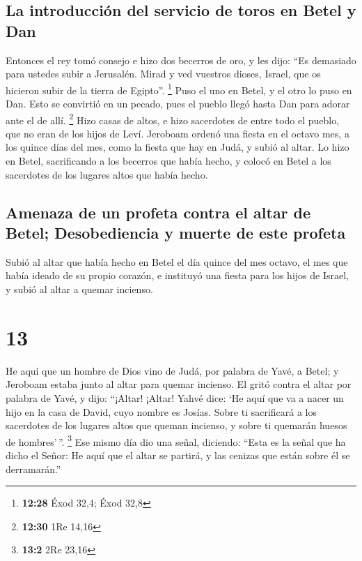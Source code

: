 \hypertarget{la-introducciuxf3n-del-servicio-de-toros-en-betel-y-dan}{%
\subsection{La introducción del servicio de toros en Betel y
Dan}\label{la-introducciuxf3n-del-servicio-de-toros-en-betel-y-dan}}

 Entonces el rey tomó consejo e hizo dos becerros de oro,
y les dijo: ``Es demasiado para ustedes subir a Jerusalén. Mirad y ved
vuestros dioses, Israel, que os hicieron subir de la tierra de Egipto''.
\footnote{\textbf{12:28} Éxod 32,4; Éxod 32,8}  Puso el
uno en Betel, y el otro lo puso en Dan.  Esto se
convirtió en un pecado, pues el pueblo llegó hasta Dan para adorar ante
el de allí. \footnote{\textbf{12:30} 1Re 14,16}  Hizo
casas de altos, e hizo sacerdotes de entre todo el pueblo, que no eran
de los hijos de Leví.  Jeroboam ordenó una fiesta en el
octavo mes, a los quince días del mes, como la fiesta que hay en Judá, y
subió al altar. Lo hizo en Betel, sacrificando a los becerros que había
hecho, y colocó en Betel a los sacerdotes de los lugares altos que había
hecho.

\hypertarget{amenaza-de-un-profeta-contra-el-altar-de-betel-desobediencia-y-muerte-de-este-profeta}{%
\subsection{Amenaza de un profeta contra el altar de Betel;
Desobediencia y muerte de este
profeta}\label{amenaza-de-un-profeta-contra-el-altar-de-betel-desobediencia-y-muerte-de-este-profeta}}

 Subió al altar que había hecho en Betel el día quince
del mes octavo, el mes que había ideado de su propio corazón, e
instituyó una fiesta para los hijos de Israel, y subió al altar a quemar
incienso.

\hypertarget{section-12}{%
\section{13}\label{section-12}}

 He aquí que un hombre de Dios vino de Judá, por palabra
de Yavé, a Betel; y Jeroboam estaba junto al altar para quemar incienso.
 El gritó contra el altar por palabra de Yavé, y dijo:
``¡Altar! ¡Altar! Yahvé dice: `He aquí que va a nacer un hijo en la casa
de David, cuyo nombre es Josías. Sobre ti sacrificará a los sacerdotes
de los lugares altos que queman incienso, y sobre ti quemarán huesos de
hombres'\,''. \footnote{\textbf{13:2} 2Re 23,16}  Ese
mismo día dio una señal, diciendo: ``Esta es la señal que ha dicho el
Señor: He aquí que el altar se partirá, y las cenizas que están sobre él
se derramarán.''

